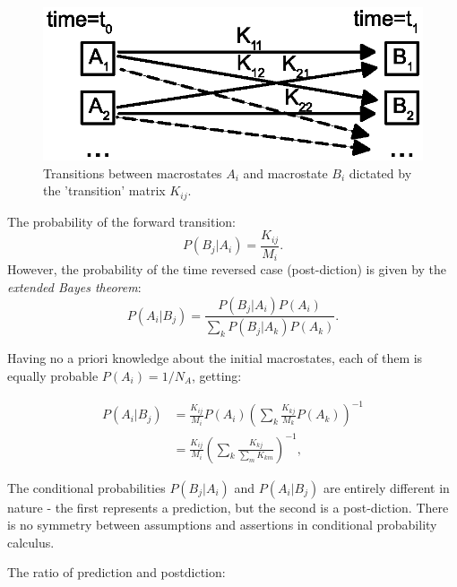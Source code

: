 \documentclass[a0]{sciposter}
\begin{document}
\begin{multicols}{3}
\begin{flushleft}
\end{flushleft}
\vspace{-0.5cm}
\begin{minipage}[b]{20.0cm}
\centering
\begin{figure}[ht!]
\includegraphics[width=20.0cm]{figure1.eps}
\caption{Transitions between macrostates ${A_i}$ and macrostate ${B_i}$ dictated by the 'transition' matrix $K_{ij}$.}
\label{Fig1} 
\end{figure}
\end{minipage}
\begin{flushleft}
\vspace{-1.0cm}
The probability of the forward transition:
\begin{equation}
\label{ForwardProb}
  P(B_j|A_i)= \frac{K_{ij}}{M_i}.
\end{equation}
However, the probability of the time reversed case (post-diction) is given by the \textit{extended Bayes theorem}:
\begin{equation}
  P(A_i|B_j)=\frac{P(B_j|A_i)P(A_i)}{\sum_k P(B_j|A_k)P(A_k)}.
\end{equation}

Having no a priori knowledge about the initial macrostates, each of them is equally probable $P(A_i)= 1/N_A$, getting:

\begin{equation}
\begin{aligned}
  P(A_i|B_j) &= \frac{K_{ij}}{M_i} P(A_i) \left( \sum_k \frac{K_{kj}}{M_k}P(A_k) \right)^{-1}\\
  &= \frac{K_{ij}}{M_i} \left( \sum_{k} \frac{K_{kj}}{\sum_m K_{km}} \right)^{-1},
\end{aligned}
\end{equation}
\vspace{0.5cm}
\begin{tcolorbox}[colframe=green!500!white,colback=white!50!white,boxrule=3pt]
The conditional probabilities $P(B_j|A_i)$ and $P(A_i|B_j)$ are entirely different in nature - the first represents a prediction, but the second is a post-diction. There is no symmetry between assumptions and assertions in conditional probability calculus.
\end{tcolorbox}
\vspace{0.5cm}
The ratio of prediction and postdiction:


\end{flushleft}
\end{multicols}
\end{document}
